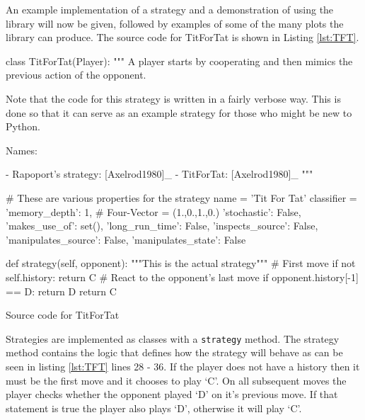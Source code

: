 An example implementation of a strategy and a demonstration of using the library will now be given, followed by examples of some of the many plots the library can produce.
The source code for TitForTat is shown in Listing \ref{lst:TFT}.

\begin{listing}[htbp!]
\begin{SourceCode}
class TitForTat(Player):
    """
    A player starts by cooperating and then mimics the previous action of the
    opponent.

    Note that the code for this strategy is written in a fairly verbose
    way. This is done so that it can serve as an example strategy for
    those who might be new to Python.

    Names:

    - Rapoport's strategy: [Axelrod1980]_
    - TitForTat: [Axelrod1980]_
    """

    # These are various properties for the strategy
    name = 'Tit For Tat'
    classifier = {
        'memory_depth': 1,  # Four-Vector = (1.,0.,1.,0.)
        'stochastic': False,
        'makes_use_of': set(),
        'long_run_time': False,
        'inspects_source': False,
        'manipulates_source': False,
        'manipulates_state': False
    }

    def strategy(self, opponent):
        """This is the actual strategy"""
        # First move
        if not self.history:
            return C
        # React to the opponent's last move
        if opponent.history[-1] == D:
            return D
        return C
\end{SourceCode}
\caption{Source code for TitForTat}
\label{lst:TFT}
\end{listing}

Strategies are implemented as classes with a \texttt{strategy} method.
The strategy method contains the logic that defines how the strategy will behave as can be seen in listing \ref{lst:TFT} lines 28 - 36.
If the player does not have a history then it must be the first move and it chooses to play `C'.
On all subsequent moves the player checks whether the opponent played `D' on it's previous move.
If that statement is true the player also plays `D', otherwise it will play `C'.
